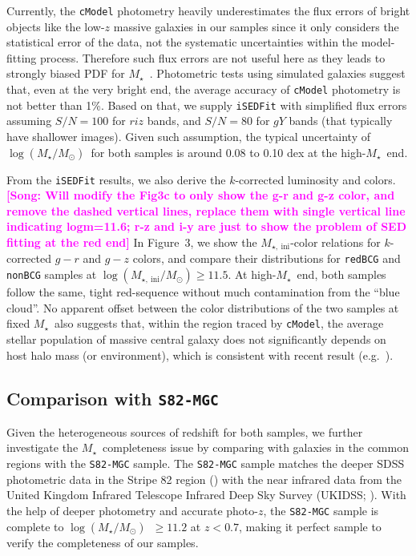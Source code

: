 \documentclass[preprint]{aastex}
\def\logms{{$\log (M_{\star}/M_{\odot})$}~}
\def\mstar{{$M_{\star}$}~}
\newcommand{\song}[1]{\textcolor{magenta}{\textbf{[Song: #1]}}}
\begin{document}
\begin{CJK*}{UTF8}{gbsn}
    Currently, the \texttt{cModel} photometry heavily underestimates the 
    flux errors of bright objects like the low-$z$ massive galaxies in our samples 
    since it only considers the statistical error of the data, not the systematic 
    uncertainties within the model-fitting process.  
    Therefore such flux errors are not useful here as they leads to strongly biased
    PDF for \mstar.  
    Photometric tests using simulated galaxies suggest that, even at the very bright 
    end, the average accuracy of \texttt{cModel} photometry is not better than 1\%.  
    Based on that, we supply \texttt{iSEDFit} with simplified flux errors assuming 
    $S/N = 100$ for $riz$ bands, and $S/N = 80$ for $gY$ bands (that typically 
    have shallower images).  
    Given such assumption, the typical uncertainty of \logms for both samples is 
    around 0.08 to 0.10 dex at the high-\mstar end. 
    
    From the \texttt{iSEDFit} results, we also derive the $k$-corrected luminosity and 
    colors.  
    \song{Will modify the Fig3c to only show the g-r and g-z color, and remove the 
    dashed vertical lines, replace them with single vertical line indicating logm=11.6; 
    r-z and i-y are just to show the problem of SED fitting at the red end}
    In Figure~3, we show the $M_{\star,\ \mathrm{ini}}$-color relations for 
    $k$-corrected $g-r$ and $g-z$ colors, and compare their distributions for 
    \texttt{redBCG} and \texttt{nonBCG} samples at 
    $\log(M_{\star,\ \mathrm{ini}}/M_{\odot}) \geq 11.5$.  
    At high-\mstar end, both samples follow the same, tight red-sequence without much 
    contamination from the ``blue cloud''.  
    No apparent offset between the color distributions of the two samples at fixed 
    \mstar also suggests that, within the region traced by \texttt{cModel}, the 
    average stellar population of massive central galaxy does not significantly depends 
    on host halo mass (or environment), which is consistent with recent result
    (e.g.~\citealt{Park2007}). 
        
\subsection{Comparison with \texttt{S82-MGC}}

    Given the heterogeneous sources of redshift for both samples, we further 
    investigate the \mstar completeness issue by comparing with galaxies in the 
    common regions with the \texttt{S82-MGC} sample. 
    The \texttt{S82-MGC} sample matches the deeper SDSS photometric data in the 
    Stripe 82 region (\citealt{Annis2014}) with the near infrared data from the 
    United Kingdom Infrared Telescope Infrared Deep Sky Survey (UKIDSS; 
    \citealt{Lawrence2007}). 
    With the help of deeper photometry and accurate photo-$z$, the \texttt{S82-MGC}
    sample is complete to \logms$\geq 11.2$ at $z<0.7$, making it perfect sample
    to verify the completeness of our samples.  
    

\end{CJK*}
\end{document}
